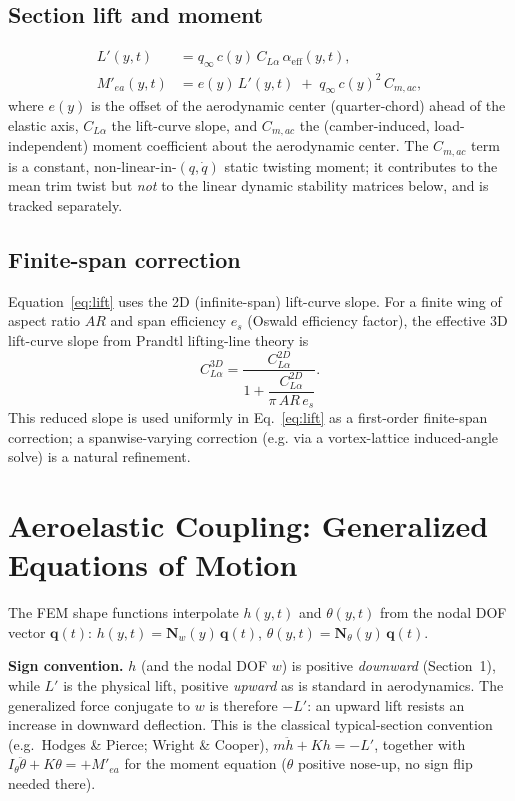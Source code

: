 \documentclass[11pt]{article}
\begin{document}
\subsection{Section lift and moment}

\begin{align}
L'(y,t) &= q_\infty\, c(y)\, C_{L\alpha}\,\alpha_{\text{eff}}(y,t), \label{eq:lift}\\
M'_{ea}(y,t) &= e(y)\,L'(y,t) \;+\; q_\infty\, c(y)^2\, C_{m,ac}, \label{eq:moment}
\end{align}
where $e(y)$ is the offset of the aerodynamic center (quarter-chord) ahead of the
elastic axis, $C_{L\alpha}$ the lift-curve slope, and $C_{m,ac}$ the (camber-induced,
load-independent) moment coefficient about the aerodynamic center. The $C_{m,ac}$ term
is a constant, non-linear-in-$(q,\dot q)$ static twisting moment; it contributes to the
mean trim twist but \emph{not} to the linear dynamic stability matrices below, and is
tracked separately.

\subsection{Finite-span correction}

Equation~\eqref{eq:lift} uses the 2D (infinite-span) lift-curve slope. For a finite wing
of aspect ratio $AR$ and span efficiency $e_s$ (Oswald efficiency factor), the
effective 3D lift-curve slope from Prandtl lifting-line theory is
\begin{equation}
C_{L\alpha}^{3D} = \frac{C_{L\alpha}^{2D}}{1 + \dfrac{C_{L\alpha}^{2D}}{\pi\, AR\, e_s}}.
\label{eq:prandtl}
\end{equation}
This reduced slope is used uniformly in Eq.~\eqref{eq:lift} as a first-order finite-span
correction; a spanwise-varying correction (e.g. via a vortex-lattice induced-angle
solve) is a natural refinement.

\section{Aeroelastic Coupling: Generalized Equations of Motion}

The FEM shape functions interpolate $h(y,t)$ and $\theta(y,t)$ from the nodal DOF vector
$\bm{q}(t)$: $h(y,t) = \bm{N}_w(y)\,\bm{q}(t)$, $\theta(y,t) = \bm{N}_\theta(y)\,\bm{q}(t)$.

\textbf{Sign convention.} $h$ (and the nodal DOF $w$) is positive \emph{downward}
(Section~1), while $L'$ is the physical lift, positive \emph{upward} as is
standard in aerodynamics. The generalized force conjugate to $w$ is therefore
$-L'$: an upward lift resists an increase in downward deflection. This is the
classical typical-section convention (e.g.\ Hodges \& Pierce; Wright \&
Cooper), $m\ddot h + K h = -L'$, together with $I_\theta \ddot\theta + K\theta =
+M'_{ea}$ for the moment equation ($\theta$ positive nose-up, no sign flip
needed there).
\end{document}
